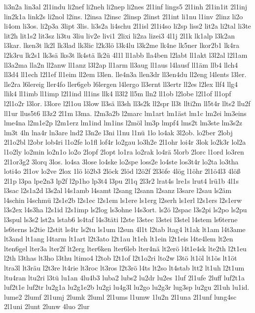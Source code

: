 {li3n2a
lin3al
2l1indu
li2nef
li2neh
li2nep
li2nes
2l1inf
lings5
2l1inh
2l1in1it
2l1inj
lin2k1a
link2s
li2nol
l2ins.
l2insa
l2insc
2linsp
2linst
2l1int
li1nu
l1inv
2linz
li2o
li4om
li3os.
li2p3a
3lipt
3lis.
li3s2a
li4schu
2l1isl
2l1i4so
li2sp
liss2
lit2a
li2tal
li3te
lit2h
lit1s2
lit3sz
li3tu
3liu
liv2e
livi1
2lixi
li2za
lizei3
4l1j
2l1k
lk1alp
l3k2an
l3kar.
lken3t
lk2l
lk3lad
lk3lic
l2k3lö
l3k4lu
l3k2me
lk4ne
lk5ner
lkor2b1
lk4ra
l2k3ru
lk2s1
lk3sä
lks3t
lk4stä
lk2ü
4l1l
ll1abb
lla4ben
l2labt
ll1akt
l3l2al
l2l1am
ll3a2ma
lla2n
ll2anw
ll1anz
l3l2ap
ll1arm
ll3aug
ll1aus
l4lausf
ll1äm
llb4
llch4
ll3d4
ll1ech
l2l1ef
ll1eim
ll2em
l3len.
lle4n3a
llen3dr
ll3en4du
ll2eng
l4lents
l3ler.
lle2ra
l6lereig
ller4fo
ller6geb
l6lergen
l4lergo
ll3ernt
ll3ertr
ll2es
l2lex
llf4
llg4
llik4
ll1imb
ll1imp
l2l1ind
ll1ins
llk4
ll3l2
ll5m
lln2
ll1ob
l2lobe
l2l1of
ll1opf
l2l1o2r
l3lor.
l3lore
l2l1ou
l3low
ll3sä
ll3sh
ll3s2k
ll2spr
ll3t
llti2m
ll5t4r
llts2
llu2f
ll1ur
llus5t6
ll3z2
2l1m
l3ma.
l2m3a2b
l2marc
lm1art
lm1äst
lm1c
lm2ei
lm3eins
lme4na
l2m1e2p
l2m1erz
lm1ind
lm1ins
l2möl
lm3p
lmpf4
lms2t
lm3ste
lm3s2z
lm3t
4ln
lna4r
ln3are
lnd2
l3n2e
l3ni
l1nu
l1nü
1lo
lo4ak
3l2ob.
lo2ber
2lobj
2l1o2bl
l2obr
lob4ri
l1o2fe
lo1fl
lof4r
lo2gau
lo3h2e
2l1ohr
loi4r
3lok
lo2k3r
lol2a
l1o2ly
lo2min
lo2n1o
lo2o
2lopf
2lopt
lo1ra
lo2rak
lo4rä
5lorb
2lorc
l1ord
lo3ren
2l1or3g2
3lorq
3los.
lo4sa
3lose
lo4ske
lo2spe
loss2e
lo4ste
los3t4r
lo2ta
lo3tha
loti4o
2l1ov
lo2ve
2lox
1lö
lö2b3
2löck
2löd
l2ö2f
2l3öfe
4lög
l1öhr
2l1ö4l3
4löß
2l1p
l3pa
lpe2n3
lp2f
l2p1ho
lp3t4
l3pu
2l1q
2l3r2
lrat4s
lre1s
lrut4
lrü1b
4l1s
l3sac
l2s1a2d
l3s2al
l4s1amb
l4samt
l2sang
l2sann
l2sanz
l3sare
l2sau
ls2äm
l4schin
l4schmü
l2s1e2b
l2s1ec
l2s1em
ls1ere
ls1erg
l2serh
ls1erl
l2s1ers
l2s1erw
l3s2ex
l4s3ha
l2s1id
l2s1imp
ls2log
ls3ohne
l4s3ort.
ls2ö
l2spac
l3s2pi
ls2po
ls2pu
l3spul
ls3s2
lst2a
lstab6
ls4taf
l4s3täti
l2ste
l3stec
l3stei
l3stel
l4stem
ls6terne
ls6terns
ls2tie
l2stit
ls4tr
ls2tu
ls1um
l2sun
4l1t
l2tab
ltag4
lt1ak
lt1am
l4t3ame
lt3and
lt1ang
l4tarm
lt1art
l2t3ato
l2t1au
lt1eh
lt1ein
l2t1eis
l4te4lem
lt2en
lten6gel
lter3a
lter2f
lt2erg
lter6ken
lter6leb
lter4nä
lt2erö
l4t1e4sk
lte2th
l2t1eu
l2th
l3thas
lt3ho
l3thu
ltimo4
l2tob
l2t1of
l2t1o2ri
lto2w
l3tö
lt1öl
lt1ös
lt1öt
ltra3l
lt3räu
l2t3re
lt4rie
lt3roc
lt3ros
l2t3rö
l4ts
lt2so
lt4stab
ltt2
lt1uh
l2t1um
ltu4ran
ltu2ri
l3tü
lu1an
4lu4b3
luba2
lubs2
lu2dr
lu2es
1luf
2l1ufe
2luff
luf2t1a
luf2t1e
luf2tr
lu2g1a
lu2g1e2b
lu2gi
lu4g3l
lu2go
lu2g3r
lug3sp
lu2gu
2l1uh
lu1id.
lume2
2lumf
2l1umj
2lumk
2luml
2l1ums
l1umw
1lu2n
2l1una
2l1unf
lung4sc
2l1uni
2lunt
2lunw
4luo
2lur
}
